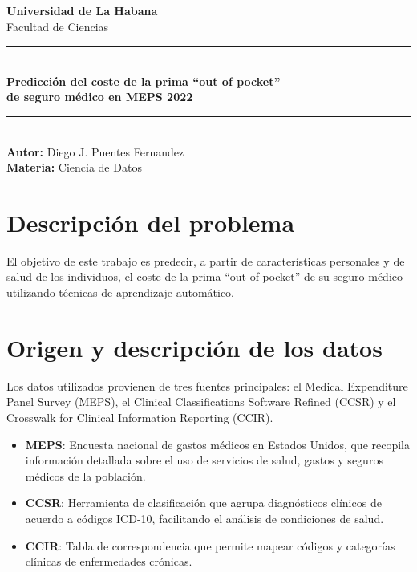 \documentclass[12pt]{article}
\begin{document}
\begin{titlepage}
    \centering
    \vspace*{1cm}
    {\Huge\bfseries Universidad de La Habana\\[0.5em]}
    {\Large Facultad de Ciencias\\[2em]}
    \rule{\textwidth}{1pt}\\[1.5em]
    {\LARGE\bfseries Predicción del coste de la prima “out of pocket”\\de seguro médico en MEPS 2022\\[1.5em]}
    \rule{\textwidth}{1pt}\\[2em]
    \vfill
    {\large\textbf{Autor:} Diego J. Puentes Fernandez\\[0.5em]}
    {\large\textbf{Materia:} Ciencia de Datos}
    \vfill
    \restoregeometry
\end{titlepage}

\tableofcontents
\newpage

\section{Descripción del problema}
El objetivo de este trabajo es predecir, a partir de características personales y de salud de los individuos, el coste de la prima “out of pocket” de su seguro médico utilizando técnicas de aprendizaje automático.

\section{Origen y descripción de los datos}
Los datos utilizados provienen de tres fuentes principales: el Medical Expenditure Panel Survey (MEPS), el Clinical Classifications Software Refined (CCSR) y el Crosswalk for Clinical Information Reporting (CCIR).

\begin{itemize}
    \item \textbf{MEPS}: Encuesta nacional de gastos médicos en Estados Unidos, que recopila información detallada sobre el uso de servicios de salud, gastos y seguros médicos de la población.
    \item \textbf{CCSR}: Herramienta de clasificación que agrupa diagnósticos clínicos de acuerdo a códigos ICD-10, facilitando el análisis de condiciones de salud.
    \item \textbf{CCIR}: Tabla de correspondencia que permite mapear códigos y categorías clínicas de enfermedades crónicas.
\end{itemize}
\end{document}
